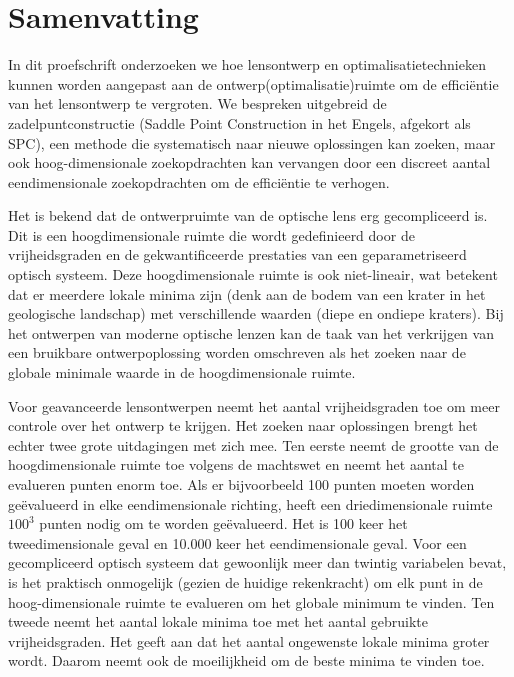 \chapter*{Samenvatting}
{

\noindent 
In dit proefschrift onderzoeken we hoe lensontwerp en optimalisatietechnieken kunnen worden aangepast aan de ontwerp(optimalisatie)ruimte om de efficiëntie van het lensontwerp te vergroten. We bespreken uitgebreid de zadelpuntconstructie (Saddle Point Construction in het Engels, afgekort als SPC), een methode die systematisch naar nieuwe oplossingen kan zoeken, maar ook hoog-dimensionale zoekopdrachten kan vervangen door een discreet aantal eendimensionale zoekopdrachten om de efficiëntie te verhogen.

Het is bekend dat de ontwerpruimte van de optische lens erg gecompliceerd is. Dit is een hoogdimensionale ruimte die wordt gedefinieerd door de vrijheidsgraden en de gekwantificeerde prestaties van een geparametriseerd optisch systeem. Deze hoogdimensionale ruimte is ook niet-lineair, wat betekent dat er meerdere lokale minima zijn (denk aan de bodem van een krater in het geologische landschap) met verschillende waarden (diepe en ondiepe kraters). Bij het ontwerpen van moderne optische lenzen kan de taak van het verkrijgen van een bruikbare ontwerpoplossing worden omschreven als het zoeken naar de globale minimale waarde in de hoogdimensionale ruimte.

Voor geavanceerde lensontwerpen neemt het aantal vrijheidsgraden toe om meer controle over het ontwerp te krijgen. Het zoeken naar oplossingen brengt het echter twee grote uitdagingen met zich mee. Ten eerste neemt de grootte van de hoogdimensionale ruimte toe volgens de machtswet en neemt het aantal te evalueren punten enorm toe. Als er bijvoorbeeld 100 punten moeten worden geëvalueerd in elke eendimensionale richting, heeft een driedimensionale ruimte $100^3$ punten nodig om te worden geëvalueerd. Het is 100 keer het tweedimensionale geval en 10.000 keer het eendimensionale geval. Voor een gecompliceerd optisch systeem dat gewoonlijk meer dan twintig variabelen bevat, is het praktisch onmogelijk (gezien de huidige rekenkracht) om elk punt in de hoog-dimensionale ruimte te evalueren om het globale minimum te vinden. Ten tweede neemt het aantal lokale minima toe met het aantal gebruikte vrijheidsgraden. Het geeft aan dat het aantal ongewenste lokale minima groter wordt. Daarom neemt ook de moeilijkheid om de beste minima te vinden toe.

}

